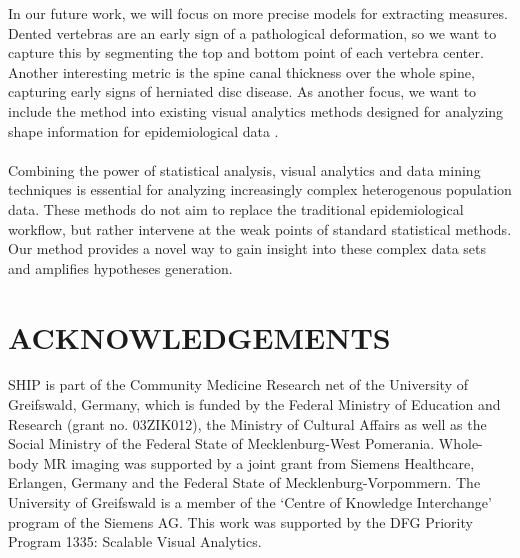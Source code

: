 \documentclass[a4paper,twoside]{style/article}
\begin{document}
In our future work, we will focus on more precise models for extracting measures.
Dented vertebras are an early sign of a pathological deformation, so we want to capture this by segmenting the top and bottom point of each vertebra center.
Another interesting metric is the spine canal thickness over the whole spine, capturing early signs of herniated disc disease.
As another focus, we want to include the method into existing visual analytics methods designed for analyzing shape information for epidemiological data \cite{Klemm2014VIS}.
\\\\
Combining the power of statistical analysis, visual analytics and data mining techniques is essential for analyzing increasingly complex heterogenous population data.
These methods do not aim to replace the traditional epidemiological workflow, but rather intervene at the weak points of standard statistical methods.
Our method provides a novel way to gain insight into these complex data sets and amplifies hypotheses generation.

\section*{\uppercase{Acknowledgements}}
\begin{small}
\noindent SHIP is part of the Community Medicine Research net of the University of Greifswald, Germany, which is funded by the Federal Ministry of Education and Research (grant no. 03ZIK012), the Ministry of Cultural Affairs as well as the Social Ministry of the Federal State of Mecklenburg-West Pomerania. Whole-body MR imaging was supported by a joint grant from Siemens Healthcare, Erlangen, Germany and the Federal State of Mecklenburg-Vorpommern. The University of Greifswald is a member of the ‘Centre of Knowledge Interchange’ program of the Siemens AG. This work was supported by the DFG Priority Program 1335: Scalable Visual Analytics.
\end{small}



{\small
}


\vfill
\end{document}
